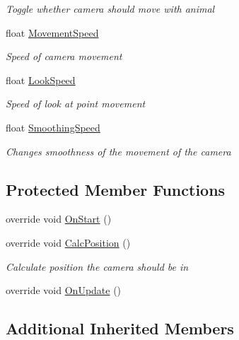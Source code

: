 \begin{DoxyCompactItemize}
\begin{DoxyCompactList}\small\item\em Toggle whether camera should move with animal \end{DoxyCompactList}\item 
float \mbox{\hyperlink{class_manual_camera_movement_ae4eb375c5c7a10c9c019798dfc0c7f02}{Movement\+Speed}}
\begin{DoxyCompactList}\small\item\em Speed of camera movement \end{DoxyCompactList}\item 
float \mbox{\hyperlink{class_manual_camera_movement_a9f58e0d15279174c688caef6c0f64d9d}{Look\+Speed}}
\begin{DoxyCompactList}\small\item\em Speed of look at point movement \end{DoxyCompactList}\item 
float \mbox{\hyperlink{class_manual_camera_movement_a368f05f76a1622fac5f6460c7f5da8d2}{Smoothing\+Speed}}
\begin{DoxyCompactList}\small\item\em Changes smoothness of the movement of the camera \end{DoxyCompactList}\end{DoxyCompactItemize}
\subsection*{Protected Member Functions}
\begin{DoxyCompactItemize}
\item 
override void \mbox{\hyperlink{class_manual_camera_movement_a7d176cf631d84d7c34b2407fd810adcf}{On\+Start}} ()
\item 
override void \mbox{\hyperlink{class_manual_camera_movement_af39bcaa57f616ec5003c1848deefb087}{Calc\+Position}} ()
\begin{DoxyCompactList}\small\item\em Calculate position the camera should be in \end{DoxyCompactList}\item 
override void \mbox{\hyperlink{class_manual_camera_movement_a0ea298439b1602ebd031bcccd411e2f4}{On\+Update}} ()
\end{DoxyCompactItemize}
\subsection*{Additional Inherited Members}


